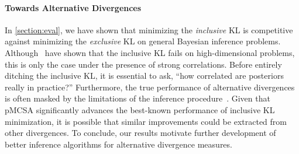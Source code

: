 \paragraph{Towards Alternative Divergences}
In \cref{section:eval}, we have shown that minimizing the \textit{inclusive} KL is competitive against  minimizing the \textit{exclusive} KL on general Bayesian inference problems.
Although~\citet{dhaka_challenges_2021} have shown that the inclusive KL fails on high-dimensional problems, this is only the case under the presence of strong correlations.
Before entirely ditching the inclusive KL, it is essential to ask, ``how correlated are posteriors really in practice?''
Furthermore, the true performance of alternative divergences is often masked by the limitations of the inference procedure~\citep{geffner2021empirical, pmlr-v139-geffner21a}.
Given that pMCSA significantly advances the best-known performance of inclusive KL minimization, it is possible that similar improvements could be extracted from other divergences.
To conclude, our results motivate further development of better inference algorithms for alternative divergence measures.


